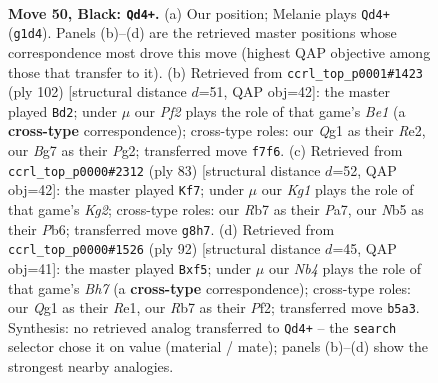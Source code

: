 \documentclass[11pt]{article}
\begin{document}
\clearpage

\begin{figure}[p]\centering
\begin{subfigure}{0.46\textwidth}\centering
\resizebox{\linewidth}{!}{%
\newchessgame
\chessboard[
  setfen={6k1/1r3pb1/R7/1n1P2R1/4N3/3K4/6N1/6q1 b - - 0 50},
  showmover=false,
  pgfstyle=straightmove, color=movearrow, markmove={g1-d4}
]}
\caption{}
\end{subfigure}\hfill
\begin{subfigure}{0.46\textwidth}\centering
\resizebox{\linewidth}{!}{%
\newchessgame
\chessboard[
  setfen={8/6pk/7p/2R5/4r3/r3n2P/4R1P1/4B1K1 w - - 0 52},
  showmover=false,
  pgfstyle=straightmove, color=movearrow, markmove={e1-d2}
]}
\caption{}
\end{subfigure}
\\[4pt]
\begin{subfigure}{0.46\textwidth}\centering
\resizebox{\linewidth}{!}{%
\newchessgame
\chessboard[
  setfen={8/p5k1/1p3p2/8/2PPKN2/r5bR/8/8 b - - 1 42},
  showmover=false,
  pgfstyle=straightmove, color=movearrow, markmove={g7-f7}
]}
\caption{}
\end{subfigure}\hfill
\begin{subfigure}{0.46\textwidth}\centering
\resizebox{\linewidth}{!}{%
\newchessgame
\chessboard[
  setfen={8/1R5B/7k/5p2/4r3/7P/3rnP1K/4R3 w - - 1 47},
  showmover=false,
  pgfstyle=straightmove, color=movearrow, markmove={h7-f5}
]}
\caption{}
\end{subfigure}
\caption{\textbf{Move 50, Black: \texttt{Qd4+}.} (a) Our position; Melanie plays \texttt{Qd4+} (\texttt{g1d4}). Panels (b)--(d) are the retrieved master positions whose correspondence most drove this move (highest QAP objective among those that transfer to it). (b) Retrieved from \texttt{ccrl\_top\_p0001\#1423} (ply 102) [structural distance $d$=51, QAP obj=42]: the master played \texttt{Bd2}; under $\mu$ our \emph{Pf2} plays the role of that game's \emph{Be1} (a \textbf{cross-type} correspondence); cross-type roles: our \emph{Q}g1 as their \emph{R}e2, our \emph{B}g7 as their \emph{P}g2; transferred move \texttt{f7f6}. (c) Retrieved from \texttt{ccrl\_top\_p0000\#2312} (ply 83) [structural distance $d$=52, QAP obj=42]: the master played \texttt{Kf7}; under $\mu$ our \emph{Kg1} plays the role of that game's \emph{Kg2}; cross-type roles: our \emph{R}b7 as their \emph{P}a7, our \emph{N}b5 as their \emph{P}b6; transferred move \texttt{g8h7}. (d) Retrieved from \texttt{ccrl\_top\_p0000\#1526} (ply 92) [structural distance $d$=45, QAP obj=41]: the master played \texttt{Bxf5}; under $\mu$ our \emph{Nb4} plays the role of that game's \emph{Bh7} (a \textbf{cross-type} correspondence); cross-type roles: our \emph{Q}g1 as their \emph{R}e1, our \emph{R}b7 as their \emph{P}f2; transferred move \texttt{b5a3}. Synthesis: no retrieved analog transferred to \texttt{Qd4+} -- the \texttt{search} selector chose it on value (material / mate); panels (b)--(d) show the strongest nearby analogies.}
\label{fig:thought-m99}
\end{figure}
\end{document}
